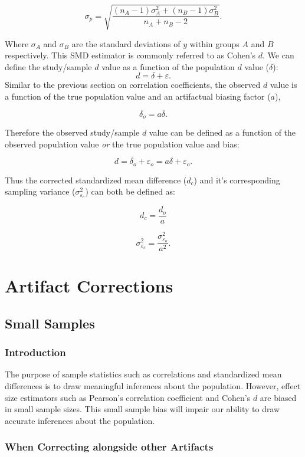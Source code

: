 \documentclass[
  letterpaper,
  DIV=11,
  numbers=noendperiod]{scrreprt}
\begin{document}
\[
\sigma_p=\sqrt{\frac{(n_A-1)\sigma^2_{A} + (n_B-1)\sigma^2_{B}}{n_A + n_B - 2}}.
\]

Where \(\sigma_{A}\) and \(\sigma_{B}\) are the standard deviations of
\(y\) within groups \(A\) and \(B\) respectively. This SMD estimator is
commonly referred to as Cohen's \(d\). We can define the study/sample
\(d\) value as a function of the population \(d\) value (\(\delta\)): \[
d = \delta + \varepsilon.
\] Similar to the previous section on correlation coefficients, the
observed \(d\) value is a function of the true population value and an
artifactual biasing factor (\(a\)),

\[
\delta_o = a\delta.
\]

Therefore the observed study/sample \(d\) value can be defined as a
function of the observed population value \emph{or} the true population
value and bias:

\[
d = \delta_o + \varepsilon_o = a\delta + \varepsilon_o.
\]

Thus the corrected standardized mean difference (\(d_c\)) and it's
corresponding sampling variance (\(\sigma^2_{\varepsilon_c}\)) can both
be defined as:

\[
d_c = \frac{d_o}{a}
\]

\[
\sigma^2_{\varepsilon_c} = \frac{\sigma^2_{\varepsilon_o}}{a^2}.
\]

\part{Artifact Corrections}

\hypertarget{small-samples}{%
\chapter{Small Samples}\label{small-samples}}

\hypertarget{introduction}{%
\section{Introduction}\label{introduction}}

The purpose of sample statistics such as correlations and standardized
mean differences is to draw meaningful inferences about the population.
However, effect size estimators such as Pearson's correlation
coefficient and Cohen's \(d\) are biased in small sample sizes. This
small sample bias will impair our ability to draw accurate inferences
about the population.

\hypertarget{when-correcting-alongside-other-artifacts}{%
\section{When Correcting alongside other
Artifacts}\label{when-correcting-alongside-other-artifacts}}
\end{document}
